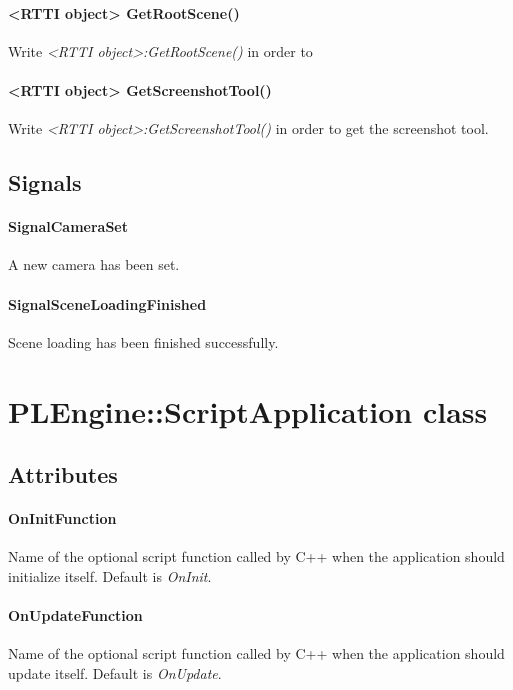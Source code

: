 \paragraph{<RTTI object> GetRootScene()}
Write \emph{<RTTI object>:GetRootScene()} in order to 

\paragraph{<RTTI object> GetScreenshotTool()}
Write \emph{<RTTI object>:GetScreenshotTool()} in order to get the screenshot tool.


\subsection{Signals}

\paragraph{SignalCameraSet}
A new camera has been set.

\paragraph{SignalSceneLoadingFinished}
Scene loading has been finished successfully.




\section{PLEngine::ScriptApplication class}


\subsection{Attributes}

\paragraph{OnInitFunction}
Name of the optional script function called by C++ when the application should initialize itself. Default is \emph{OnInit}.

\paragraph{OnUpdateFunction}
Name of the optional script function called by C++ when the application should update itself. Default is \emph{OnUpdate}.


